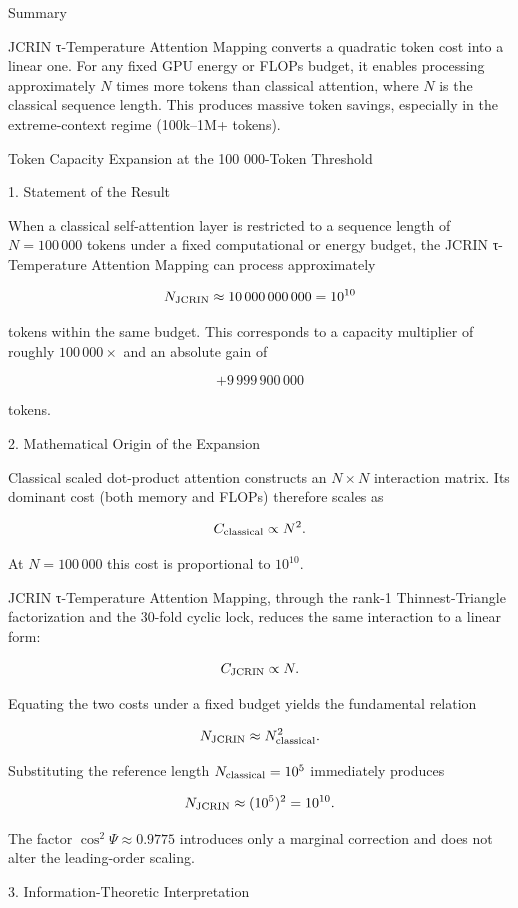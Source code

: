 Summary

JCRIN τ-Temperature Attention Mapping converts a quadratic token cost into a linear one.  
For any fixed GPU energy or FLOPs budget, it enables processing approximately \(N\) times more tokens than classical attention, where \(N\) is the classical sequence length. This produces massive token savings, especially in the extreme-context regime (100k–1M+ tokens).

Token Capacity Expansion at the 100 000-Token Threshold

1. Statement of the Result

When a classical self-attention layer is restricted to a sequence length of \( N = 100\,000 \) tokens under a fixed computational or energy budget, the JCRIN τ-Temperature Attention Mapping can process approximately

\[
N_{\rm JCRIN} \approx 10\,000\,000\,000 = 10^{10}
\]

tokens within the same budget. This corresponds to a capacity multiplier of roughly \( 100\,000\times \) and an absolute gain of

\[
+9\,999\,900\,000
\]

tokens.

2. Mathematical Origin of the Expansion

Classical scaled dot-product attention constructs an \( N \times N \) interaction matrix. Its dominant cost (both memory and FLOPs) therefore scales as

\[
C_{\rm classical} \propto N^{2}.
\]

At \( N = 100\,000 \) this cost is proportional to \( 10^{10} \).

JCRIN τ-Temperature Attention Mapping, through the rank-1 Thinnest-Triangle factorization and the 30-fold cyclic lock, reduces the same interaction to a linear form:

\[
C_{\rm JCRIN} \propto N.
\]

Equating the two costs under a fixed budget yields the fundamental relation

\[
N_{\rm JCRIN} \approx N_{\rm classical}^{2}.
\]

Substituting the reference length \( N_{\rm classical} = 10^{5} \) immediately produces

\[
N_{\rm JCRIN} \approx (10^{5})^{2} = 10^{10}.
\]

The factor \( \cos^{2}\Psi \approx 0.9775 \) introduces only a marginal correction and does not alter the leading-order scaling.

3. Information-Theoretic Interpretation

